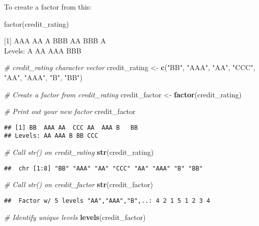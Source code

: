 \documentclass[]{article}
\newenvironment{Shaded}{\begin{snugshade}}{\end{snugshade}}
\newcommand{\KeywordTok}[1]{\textcolor[rgb]{0.13,0.29,0.53}{\textbf{#1}}}
\newcommand{\StringTok}[1]{\textcolor[rgb]{0.31,0.60,0.02}{#1}}
\newcommand{\CommentTok}[1]{\textcolor[rgb]{0.56,0.35,0.01}{\textit{#1}}}
\newcommand{\NormalTok}[1]{#1}
\begin{document}
To create a factor from this:

factor(credit\_rating)

{[}1{]} AAA AA A BBB AA BBB A\\
Levels: A AA AAA BBB

\begin{Shaded}
\begin{Highlighting}[]
\CommentTok{# credit_rating character vector}
\NormalTok{credit_rating <-}\StringTok{ }\KeywordTok{c}\NormalTok{(}\StringTok{"BB"}\NormalTok{, }\StringTok{"AAA"}\NormalTok{, }\StringTok{"AA"}\NormalTok{, }\StringTok{"CCC"}\NormalTok{, }\StringTok{"AA"}\NormalTok{, }\StringTok{"AAA"}\NormalTok{, }\StringTok{"B"}\NormalTok{, }\StringTok{"BB"}\NormalTok{)}

\CommentTok{# Create a factor from credit_rating}
\NormalTok{credit_factor <-}\StringTok{ }\KeywordTok{factor}\NormalTok{(credit_rating)}

\CommentTok{# Print out your new factor}
\NormalTok{credit_factor}
\end{Highlighting}
\end{Shaded}

\begin{verbatim}
## [1] BB  AAA AA  CCC AA  AAA B   BB 
## Levels: AA AAA B BB CCC
\end{verbatim}

\begin{Shaded}
\begin{Highlighting}[]
\CommentTok{# Call str() on credit_rating}
\KeywordTok{str}\NormalTok{(credit_rating)}
\end{Highlighting}
\end{Shaded}

\begin{verbatim}
##  chr [1:8] "BB" "AAA" "AA" "CCC" "AA" "AAA" "B" "BB"
\end{verbatim}

\begin{Shaded}
\begin{Highlighting}[]
\CommentTok{# Call str() on credit_factor}
\KeywordTok{str}\NormalTok{(credit_factor)}
\end{Highlighting}
\end{Shaded}

\begin{verbatim}
##  Factor w/ 5 levels "AA","AAA","B",..: 4 2 1 5 1 2 3 4
\end{verbatim}

\begin{Shaded}
\begin{Highlighting}[]
\CommentTok{# Identify unique levels}
\KeywordTok{levels}\NormalTok{(credit_factor)}
\end{Highlighting}
\end{Shaded}
\end{document}
